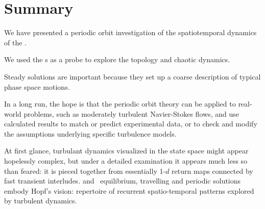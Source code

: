 %



\section{Summary}
\label{sect:rpo-sum}


We have presented a periodic orbit investigation
of the spatiotemporal dynamics of the
{\KSe}.

We used
the {\rpo}s as a probe to explore the topology and chaotic dynamics.

Steady solutions are important because they set up 
a coarse description of 
typical phase space motions.

In a long run, the hope is that the periodic orbit theory
can be applied to real-world
problems, such as moderately turbulent Navier-Stokes
flows, and use calculated results to match or predict
experimental data, or to check and modify the assumptions underlying specific
turbulence models.


At first glance, turbulant dynamics visualized in the state space might appear
hopelessly complex, but under a detailed examination it appears 
much less so than feared: it is
pieced together from essentially {1-$d$ return maps}
connected by fast transient interludes.
{\KS} and \PCf\  equilibrium, travelling and 
periodic solutions embody Hopf's vision:
repertoire of recurrent spatio-temporal
patterns explored by turbulent dynamics.


